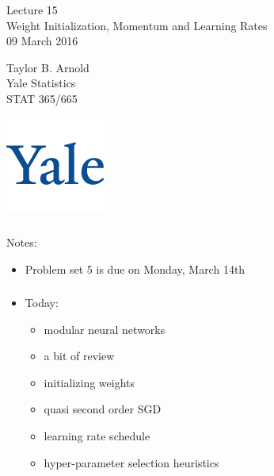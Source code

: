 \documentclass[xetex,mathserif,serif,aspectratio=169]{beamer}
\begin{document}
\begin{frame}[fragile] \frametitle{} \oldB \small

\vfill

{\fontsize{0.7cm}{0cm}\selectfont Lecture 15 \\\vspace{0.2cm} Weight Initialization,
Momentum and Learning Rates}\\\vspace{0.5cm}
09 March 2016

\vspace{2cm}

\begin{minipage}{0.6\textwidth}
Taylor B. Arnold \\
Yale Statistics \\
STAT 365/665
\end{minipage}
\hfill
\begin{minipage}{0.3\textwidth}\raggedleft
\includegraphics[scale=0.3]{../yale-logo.png}
\end{minipage}%

\end{frame}

\begin{frame}[fragile] \frametitle{} \oldB \small

Notes:
\begin{itemize}
\item Problem set 5 is due on Monday, March 14th
\end{itemize}

\end{frame}

\begin{frame}[fragile] \frametitle{} \oldB \small

\begin{itemize}
\item Today:
\begin{itemize}
\item modular neural networks
\item a bit of review
\item initializing weights
\item quasi second order SGD
\item learning rate schedule
\item hyper-parameter selection heuristics
\end{itemize}
\end{itemize}

\end{frame}
\end{document}
